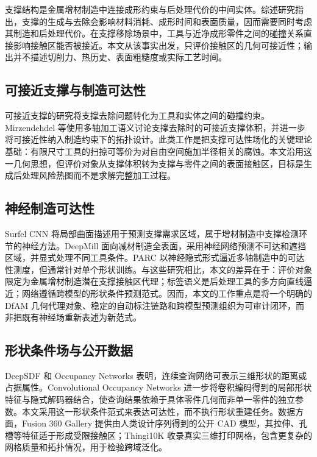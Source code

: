 支撑结构是金属增材制造中连接成形约束与后处理代价的中间实体。综述研究指出，支撑的生成与去除会影响材料消耗、成形时间和表面质量，因而需要同时考虑其制造和后处理代价\cite{jiang2018support}。在支撑移除场景中，工具与近净成形零件之间的碰撞关系直接影响接触区能否被接近\cite{nelaturi2019automatic}。本文从该事实出发，只评价接触区的几何可接近性；输出并不描述切削力、热历史、表面粗糙度或实际工艺时间。

\subsection{可接近支撑与制造可达性}

可接近支撑的研究将支撑去除问题转化为工具和实体之间的碰撞约束。Mirzendehdel 等使用多轴加工语义讨论支撑去除时的可接近支撑体积\cite{mirzendehdel2021orientation}，并进一步将可接近性纳入制造约束下的拓扑设计\cite{mirzendehdel2022topology}。此类工作是把支撑可达性场化的关键理论基础：有限尺寸工具的扫掠可等价为对自由空间施加半径相关的腐蚀。本文沿用这一几何思想，但评价对象从支撑体积转为支撑与零件之间的表面接触区，目标是生成后处理风险热图而不是求解完整加工过程。

\subsection{神经制造可达性}

Surfel CNN 将局部曲面描述用于预测支撑需求区域，属于增材制造中支撑检测环节的神经方法\cite{huang2019surfel}。DeepMill 面向减材制造全表面，采用神经网络预测不可达和遮挡区域，并显式处理不同工具条件\cite{zhong2025deepmill}。PARC 以神经隐式形式逼近多轴制造中的可达性测度，但通常针对单个形状训练\cite{harabin2023deep}。与这些研究相比，本文的差异在于：评价对象限定为金属增材制造潜在支撑接触区代理；标签语义是后处理工具的多方向直线逼近；网络遵循跨模型的形状条件预测范式。因而，本文的工作重点是将一个明确的 DfAM 几何代理对象、稳定的自动标注链路和跨模型预测组织为可审计闭环，而非把既有神经场重新表述为新范式。

\subsection{形状条件场与公开数据}

DeepSDF 和 Occupancy Networks 表明，连续查询网络可表示三维形状的距离或占据属性\cite{park2019deepsdf,mescheder2019occupancy}。Convolutional Occupancy Networks 进一步将卷积编码得到的局部形状特征与隐式解码器结合，使查询结果依赖于具体零件几何而非单一零件的独立参数\cite{peng2020convonet}。本文采用这一形状条件范式来表达可达性，而不执行形状重建任务。数据方面，Fusion 360 Gallery 提供由人类设计序列得到的公开 CAD 模型\cite{willis2021fusion}，其拉伸、孔槽等特征适于形成受限接触区；Thingi10K 收录真实三维打印网格，包含更复杂的网格质量和拓扑情况\cite{zhou2016thingi10k}，用于检验跨域泛化。

